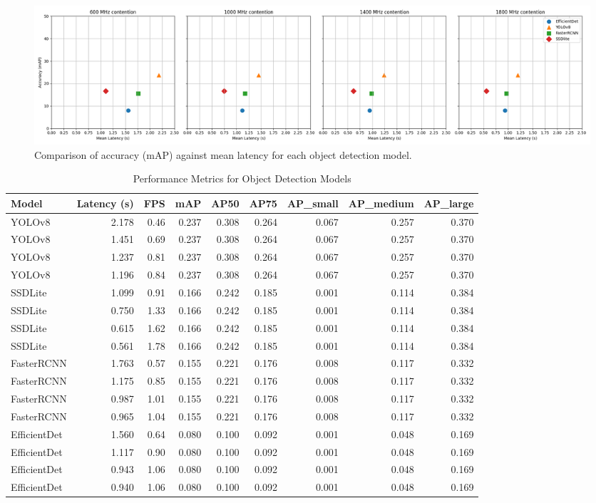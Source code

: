 \documentclass[10pt,twocolumn,letterpaper]{article}
\begin{document}
\begin{figure}[t]
  \centering
  \includegraphics[width=1\linewidth]{images/accuracy_latency_graph.png}
  \caption{Comparison of accuracy (mAP) against mean latency for each object detection model.}
  \label{fig:accuracy_latency}
\end{figure}

\begin{table}[t]
\centering
\caption{Performance Metrics for Object Detection Models}
\label{tab:metrics}
\begin{tabular}{@{}lrrrrrrrr@{}}
Model & Latency (s) & FPS & mAP& AP50 & AP75 & AP\_small & AP\_medium & AP\_large \\
\midrule
YOLOv8 & 2.178 & 0.46 & 0.237 & 0.308 & 0.264 & 0.067 & 0.257 & 0.370 \\
YOLOv8 & 1.451 & 0.69 & 0.237 & 0.308 & 0.264 & 0.067 & 0.257 & 0.370 \\
YOLOv8 & 1.237 & 0.81 & 0.237 & 0.308 & 0.264 & 0.067 & 0.257 & 0.370 \\
YOLOv8 & 1.196 & 0.84 & 0.237 & 0.308 & 0.264 & 0.067 & 0.257 & 0.370 \\
\hline
SSDLite & 1.099 & 0.91 & 0.166 & 0.242 & 0.185 & 0.001 & 0.114 & 0.384 \\
SSDLite & 0.750 & 1.33 & 0.166 & 0.242 & 0.185 & 0.001 & 0.114 & 0.384 \\
SSDLite & 0.615 & 1.62 & 0.166 & 0.242 & 0.185 & 0.001 & 0.114 & 0.384 \\
SSDLite & 0.561 & 1.78 & 0.166 & 0.242 & 0.185 & 0.001 & 0.114 & 0.384 \\
\hline
FasterRCNN & 1.763 & 0.57 & 0.155 & 0.221 & 0.176 & 0.008 & 0.117 & 0.332 \\
FasterRCNN & 1.175 & 0.85 & 0.155 & 0.221 & 0.176 & 0.008 & 0.117 & 0.332 \\
FasterRCNN & 0.987 & 1.01 & 0.155 & 0.221 & 0.176 & 0.008 & 0.117 & 0.332 \\
FasterRCNN & 0.965 & 1.04 & 0.155 & 0.221 & 0.176 & 0.008 & 0.117 & 0.332 \\
\hline
EfficientDet & 1.560 & 0.64 & 0.080 & 0.100 & 0.092 & 0.001 & 0.048 & 0.169 \\
EfficientDet & 1.117 & 0.90 & 0.080 & 0.100 & 0.092 & 0.001 & 0.048 & 0.169 \\
EfficientDet & 0.943 & 1.06 & 0.080 & 0.100 & 0.092 & 0.001 & 0.048 & 0.169 \\
EfficientDet & 0.940 & 1.06 & 0.080 & 0.100 & 0.092 & 0.001 & 0.048 & 0.169 \\
\end{tabular}
\end{table}
\end{document}
